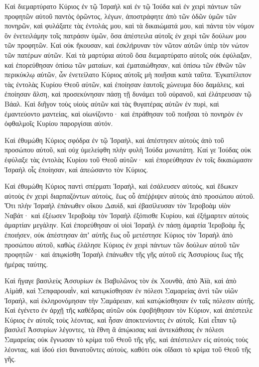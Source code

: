 {\par }{\PP {}Καὶ διεμαρτύρατο Κύριος ἐν τῷ Ἰσραὴλ καὶ ἐν τῷ Ἰούδα καὶ ἐν χειρὶ πάντων τῶν προφητῶν αὐτοῦ παντὸς ὁρῶντος, λέγων, ἀποστράφητε ἀπὸ τῶν ὁδῶν ὑμῶν τῶν πονηρῶν, καὶ φυλάξατε τὰς ἐντολάς μου, καὶ τὰ δικαιώματά μου, καὶ πάντα τὸν νόμον ὃν ἐνετειλάμην τοῖς πατράσιν ὑμῶν, ὅσα ἀπέστειλα αὐτοῖς ἐν χειρὶ τῶν δούλων μου τῶν προφητῶν.
Καὶ οὐκ ἤκουσαν, καὶ ἐσκλήρυναν τὸν νῶτον αὐτῶν ὑπὲρ τὸν νώτον τῶν πατέρων αὐτῶν.
Καὶ τὰ μαρτύρια αὐτοῦ ὅσα διεμαρτύρατο αὐτοῖς οὐκ ἐφύλαξαν, καὶ ἐπορεύθησαν ὀπίσω τῶν ματαίων, καὶ ἐματαιώθησαν, καὶ ὀπίσω τῶν ἐθνῶν τῶν περικύκλῳ αὐτῶν, ὧν ἐνετείλατο Κύριος αὐτοῖς μὴ ποιῆσαι κατὰ ταῦτα.
Ἐγκατέλιπον τὰς ἐντολὰς Κυρίου Θεοῦ αὐτῶν, καὶ ἐποίησαν ἑαυτοῖς χώνευμα δύο δαμάλεις, καὶ ἐποίησαν ἄλση, καὶ προσεκύνησαν πάσῃ τῇ δυνάμει τοῦ οὐρανοῦ, καὶ ἐλάτρευσαν τῷ Βάαλ.
Καὶ διῆγον τοὺς υἱοὺς αὐτῶν καὶ τὰς θυγατέρας αὐτῶν ἐν πυρὶ, καὶ ἐμαντεύοντο μαντείας, καὶ οἰωνίζοντο· καὶ ἐπράθησαν τοῦ ποιῆσαι τὸ πονηρὸν ἐν ὀφθαλμοῖς Κυρίου παροργίσαι αὐτόν.
\par }{\PP {}Καὶ ἐθυμώθη Κύριος σφόδρα ἐν τῷ Ἰσραὴλ, καὶ ἀπέστησεν αὐτοὺς ἀπὸ τοῦ προσώπου αὐτοῦ, καὶ οὐχ ὑμελείφθη πλὴν φυλὴ Ἰούδα μονωτάτη.
Καί γε Ἰούδας οὐκ ἐφύλαξε τὰς ἐντολὰς Κυρίου τοῦ Θεοῦ αὐτῶν· καὶ ἐπορεύθησαν ἐν τοῖς δικαιώμασιν Ἰσραὴλ οἷς ἐποίησαν, καὶ ἀπεώσαντο τὸν Κύριος.
\par }{\PP {}Καὶ ἐθυμώθη Κύριος παντὶ σπέρματι Ἰσραὴλ, καὶ ἐσάλευσεν αὐτοὺς, καὶ ἔδωκεν αὐτοὺς ἐν χειρὶ διαρπαζόντων αὐτοὺς, ἕως οὗ ἀπέῤῥιψεν αὐτοὺς ἀπὸ προσώπου αὐτοῦ.
Ὅτι πλὴν Ἰσραὴλ ἐπάνωθεν οἴκου Δαυὶδ, καὶ ἐβασίλευσαν τὸν Ἱεροβοὰμ υἱὸν Ναβάτ· καὶ ἐξέωσεν Ἱεροβοὰμ τὸν Ἰσραὴλ ἐξόπισθε Κυρίου, καὶ ἐξήμαρτεν αὐτοὺς ἁμαρτίαν μεγάλην.
Καὶ ἐπορεύθησαν οἱ υἱοὶ Ἰσραὴλ ἐν πάσῃ ἁμαρτία Ἱεροβοὰμ ἧς ἐποιήσεν, οὐκ ἀπέστησαν ἀπʼ αὐτῆς
ἕως οὗ μετέστησε Κύριος τὸν Ἰσραὴλ ἀπὸ προσώπου αὐτοῦ, καθὼς ἐλάλησε Κύριος ἐν χειρὶ πάντων τῶν δούλων αὐτοῦ τῶν προφητῶν· καὶ ἀπῳκίσθη Ἰσραὴλ ἐπάνωθεν τῆς γῆς αὐτοῦ εἰς Ἀσσυρίους ἕως τῆς ἡμέρας ταύτης.
\par }{\PP {}Καὶ ἤγαγε βασιλεὺς Ἀσσυρίων ἐκ Βαβυλῶνος τὸν ἐκ Χουνθὰ, ἀπὸ Ἀϊὰ, καὶ ἀπὸ Αἱμὰθ, καὶ Σεπφαρουαῒν, καὶ κατῳκίσθησαν ἐν πόλεσι Σαμαρείας ἀντὶ τῶν υἱῶν Ἰσραὴλ, καὶ ἐκληρονόμησαν τὴν Σαμάρειαν, καὶ κατῴκίσθησαν ἐν ταῖς πόλεσιν αὐτῆς.
Καὶ ἐγένετο ἐν ἀρχῇ τῆς καθέδρας αὐτῶν οὐκ ἐφοβήθησαν τὸν Κύριον, καὶ ἀπέστειλε Κύριος ἐν αὐτοῖς τοὺς λέοντας, καὶ ἦσαν ἀποκτενίοντες ἐν αὐτοῖς.
Καὶ εἶπαν τῷ βασιλεῖ Ἀσσυρίων λέγοντες, τὰ ἔθνη ἃ ἀπῴκισας καὶ ἀντεκάθισας ἐν πόλεσι Σαμαρείας οὐκ ἔγνωσαν τὸ κρίμα τοῦ Θεοῦ τῆς γῆς, καὶ ἀπέστειλεν εἰς αὐτοὺς τοὺς λέοντας, καὶ ἰδού εἰσι θανατοῦντες αὐτοὺς, καθότι οὐκ οἴδασι τὸ κρίμα τοῦ Θεοῦ τῆς γῆς.
}
